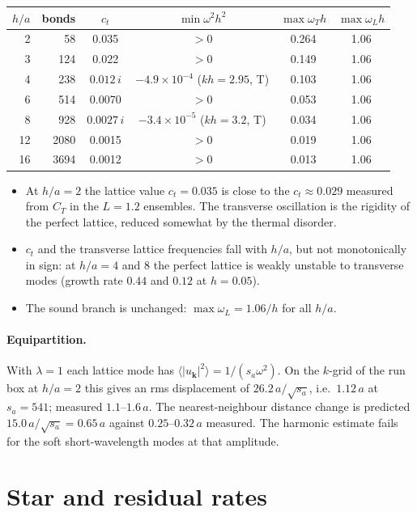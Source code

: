 \documentclass[11pt,aps,preprint,nofootinbib,superscriptaddress,tightenlines]{revtex4-2}
\newcommand{\avg}[1]{\langle #1\rangle}
\let\oldparagraph\paragraph
\renewcommand{\paragraph}{\par\bigskip\oldparagraph}
\begin{document}
\begin{center}
\begin{tabular}{rrcccc}
$h/a$ & bonds & $c_t$ & $\min\omega^2h^2$ & $\max\omega_Th$ & $\max\omega_Lh$ \\ \hline
2  &   58 & 0.035  & $>0$ & 0.264 & 1.06 \\
3  &  124 & 0.022  & $>0$ & 0.149 & 1.06 \\
4  &  238 & $0.012\,i$ & $-4.9\times10^{-4}$ ($kh=2.95$, T) & 0.103 & 1.06 \\
6  &  514 & 0.0070 & $>0$ & 0.053 & 1.06 \\
8  &  928 & $0.0027\,i$ & $-3.4\times10^{-5}$ ($kh=3.2$, T) & 0.034 & 1.06 \\
12 & 2080 & 0.0015 & $>0$ & 0.019 & 1.06 \\
16 & 3694 & 0.0012 & $>0$ & 0.013 & 1.06
\end{tabular}
\end{center}
\begin{itemize}
\item At $h/a=2$ the lattice value $c_t=0.035$ is close to the $c_t\approx0.029$
  measured from $C_T$ in the $L=1.2$ ensembles.  The transverse oscillation is the
  rigidity of the perfect lattice, reduced somewhat by the thermal disorder.
\item $c_t$ and the transverse lattice frequencies fall with $h/a$, but not
  monotonically in sign: at $h/a=4$ and $8$ the perfect lattice is weakly
  unstable to transverse modes (growth rate $0.44$ and $0.12$ at $h=0.05$).
\item The sound branch is unchanged: $\max\omega_L=1.06/h$ for all $h/a$.
\end{itemize}

\paragraph{Equipartition.}  With $\lambda=1$ each lattice mode has
$\avg{|u_{\bm k}|^2}=1/(s_a\omega^2)$.  On the $k$-grid of the run box at $h/a=2$
this gives an rms displacement of $26.2\,a/\sqrt{s_a}$, i.e.\ $1.12\,a$ at
$s_a=541$; measured $1.1$--$1.6\,a$.  The nearest-neighbour distance change is
predicted $15.0\,a/\sqrt{s_a}=0.65\,a$ against $0.25$--$0.32\,a$ measured.  The
harmonic estimate fails for the soft short-wavelength modes at that amplitude.

\section{Star and residual rates}
\end{document}
